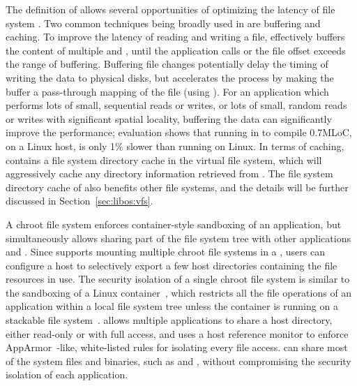 The definition of \thehostabi{} allows several opportunities of optimizing the latency of file system \linuxapi{}.
Two common techniques being broadly used in \thelibos{}
are buffering and caching.
To improve the latency of reading and writing a file,
\thelibos{} effectively buffers the content of multiple  and  \linuxapis{},
until the application calls  or the file offset exceeds the range of buffering.
Buffering file changes potentially delay the timing of writing the data
to physical disks,
but \thelibos{} accelerates the process
by making the buffer a pass-through mapping of the file (using ).
For an application which
performs lots of small, sequential reads or writes,
or lots of small, random reads or writes with significant spatial locality,
buffering the data
can significantly improve the performance;
evaluation shows that
running  in \graphene{} to compile 0.7MLoC, on a Linux host, 
is only 1\% slower than running on Linux.
In terms of caching, \thelibos{} contains a file system directory cache
in the virtual file system,
which will aggressively cache any directory information
retrieved from \thehostabi{}.
The file system directory cache of \thelibos{} also benefits other file systems,
and the details will be further discussed in Section~\ref{sec:libos:vfs}.



A chroot file system enforces container-style sandboxing of an application,
but simultaneously
allows sharing part of the file system tree
with other applications and \picoprocs{}.
Since \thelibos{} supports mounting multiple chroot file systems in a \picoproc{},
\graphene{} users can configure a host to selectively export a few host directories containing the file resources in use.
The security isolation of a single chroot file system %
is similar to the sandboxing of a Linux container~\cite{lxc}, which restricts all the file operations of an application within a local file system tree unless the container is running on a stackable file system~\cite{aufs}.
\graphene{} allows multiple applications to share a host directory, either read-only or with full access,
and uses a host reference monitor
to enforce AppArmor~\cite{apparmor}-like, white-listed rules
for isolating every file access.
\graphene{} can share most of the system files and binaries,
such as  and ,
without compromising the security isolation of each application.





